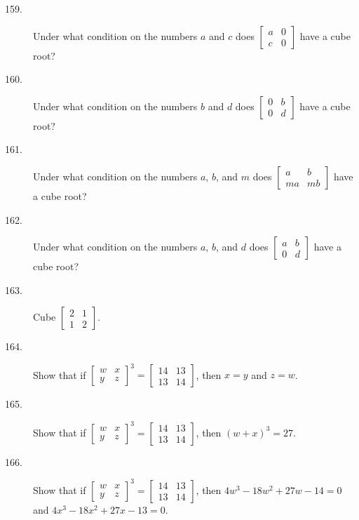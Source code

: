 \documentclass{article}
\begin{document}
\begin{description}

  \item[159.] Under what condition on the numbers $a$ and $c$ does $\begin{bmatrix} a & 0 \\ c & 0 \end{bmatrix}$ have a cube root?

  \item[160.] Under what condition on the numbers $b$ and $d$ does $\begin{bmatrix} 0 & b \\ 0 & d \end{bmatrix}$ have a cube root?

  \item[161.] Under what condition on the numbers $a$, $b$, and $m$ does $\begin{bmatrix} a & b \\ ma & mb \end{bmatrix}$ have a cube root?

  \item[162.] Under what condition on the numbers $a$, $b$, and $d$ does $\begin{bmatrix} a & b \\ 0 & d \end{bmatrix}$ have a cube root?

  \item[163.] Cube $\begin{bmatrix} 2 & 1 \\ 1 & 2 \end{bmatrix}$.

  \item[164.] Show that if $\begin{bmatrix} w & x \\ y & z \end{bmatrix}^3  =  \begin{bmatrix} 14 & 13 \\ 13 & 14 \end{bmatrix}$, then $x=y$ and $z=w$.

  \item[165.] Show that if $\begin{bmatrix} w & x \\ y & z \end{bmatrix}^3  =  \begin{bmatrix} 14 & 13\\ 13 & 14 \end{bmatrix}$, then $(w+x)^3 = 27$.

  \item[166.] Show that if $\begin{bmatrix} w & x \\ y & z \end{bmatrix}^3  =  \begin{bmatrix} 14 & 13 \\ 13 & 14 \end{bmatrix}$, then $4w^3 - 18w^2 + 27w - 14 = 0$ and $4x^3 - 18x^2 + 27x - 13 = 0$.

\end{description}
\end{document}
